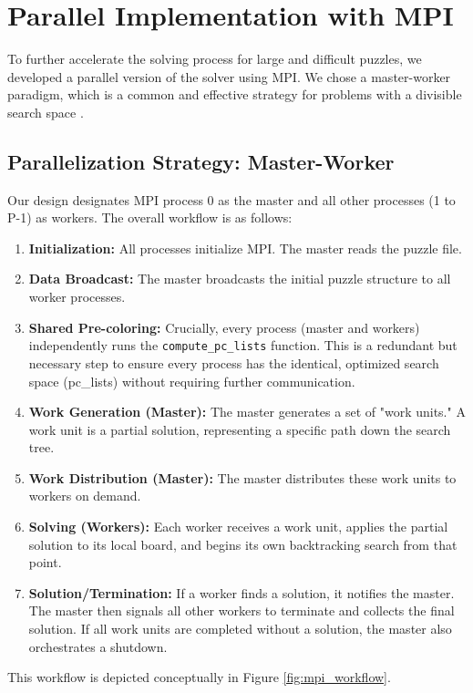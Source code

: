 \section{Parallel Implementation with MPI}
To further accelerate the solving process for large and difficult puzzles, we developed a parallel version of the solver using MPI. We chose a master-worker paradigm, which is a common and effective strategy for problems with a divisible search space \cite{Pacheco2011}.

\subsection{Parallelization Strategy: Master-Worker}
Our design designates MPI process 0 as the master and all other processes (1 to P-1) as workers. The overall workflow is as follows:
\begin{enumerate}
    \item \textbf{Initialization:} All processes initialize MPI. The master reads the puzzle file.
    \item \textbf{Data Broadcast:} The master broadcasts the initial puzzle structure to all worker processes.
    \item \textbf{Shared Pre-coloring:} Crucially, every process (master and workers) independently runs the \texttt{compute\_pc\_lists} function. This is a redundant but necessary step to ensure every process has the identical, optimized search space (pc\_lists) without requiring further communication.
    \item \textbf{Work Generation (Master):} The master generates a set of "work units." A work unit is a partial solution, representing a specific path down the search tree.
    \item \textbf{Work Distribution (Master):} The master distributes these work units to workers on demand.
    \item \textbf{Solving (Workers):} Each worker receives a work unit, applies the partial solution to its local board, and begins its own backtracking search from that point.
    \item \textbf{Solution/Termination:} If a worker finds a solution, it notifies the master. The master then signals all other workers to terminate and collects the final solution. If all work units are completed without a solution, the master also orchestrates a shutdown.
\end{enumerate}

This workflow is depicted conceptually in Figure \ref{fig:mpi_workflow}.

